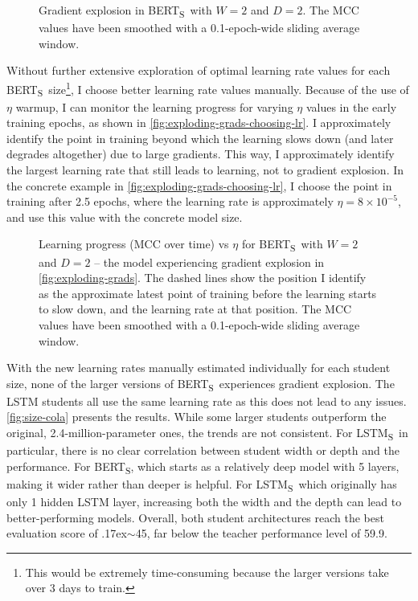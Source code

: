 \documentclass[bsc,frontabs,singlespacing,parskip,deptreport]{infthesis}
\def\mytilde{{\raise.17ex\hbox{$\scriptstyle\sim$}}}
\def\BERTS{BERT\textsubscript{S}}
\def\LSTMS{LSTM\textsubscript{S}}
\begin{document}
{{{{        \begin{figure}[h!t]
          \centering
          \caption{Gradient explosion in \BERTS~with $W=2$ and $D=2$. The MCC values have been smoothed with a 0.1-epoch-wide sliding average window.}
          \label{fig:exploding-grads}
        \end{figure}

        Without further extensive exploration of optimal learning rate values for each \BERTS~size\footnote{This would be extremely time-consuming because the larger versions take over 3 days to train.}, I choose better learning rate values manually.
        Because of the use of $\eta$ warmup, I can monitor the learning progress for varying $\eta$ values in the early training epochs, as shown in \autoref{fig:exploding-grads-choosing-lr}. I approximately identify the point in training beyond which the learning slows down (and later degrades altogether) due to large gradients. This way, I approximately identify the largest learning rate that still leads to learning, not to gradient explosion. In the concrete example in \autoref{fig:exploding-grads-choosing-lr}, I choose the point in training after 2.5 epochs, where the learning rate is approximately $\eta=8\times10^{-5}$, and use this value with the concrete model size.
        
        \begin{figure}[h!t]
          \centering
          \caption{Learning progress (MCC over time) vs $\eta$ for \BERTS~with $W=2$ and $D=2$ -- the model experiencing gradient explosion in \autoref{fig:exploding-grads}. The dashed lines show the position I identify as the approximate latest point of training before the learning starts to slow down, and the learning rate at that position.
          The MCC values have been smoothed with a 0.1-epoch-wide sliding average window.}
          \label{fig:exploding-grads-choosing-lr}
        \end{figure}

        With the new learning rates manually estimated individually for each student size, none of the larger versions of \BERTS~experiences gradient explosion. The LSTM students all use the same learning rate as this does not lead to any issues. \autoref{fig:size-cola} presents the results. While some larger students outperform the original, 2.4-million-parameter ones, the trends are not consistent. For \LSTMS~in particular, there is no clear correlation between student width or depth and the performance. For \BERTS, which starts as a relatively deep model with 5 layers, making it wider rather than deeper is helpful. For \LSTMS~which originally has only 1 hidden LSTM layer, increasing both the width and the depth can lead to better-performing models. Overall, both student architectures reach the best evaluation score of \mytilde45, far below the teacher performance level of 59.9. 

}}}}
\end{document}

